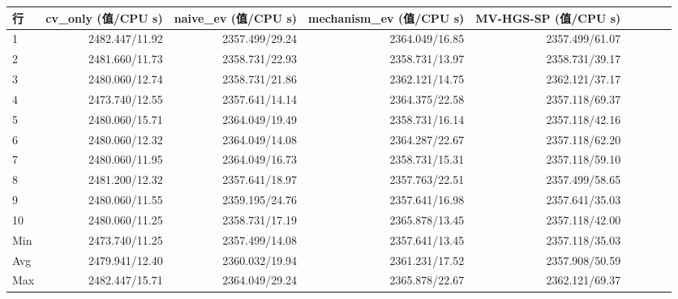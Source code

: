 \begin{tabular}{lrrrrrrrr}
\toprule
行 & cv_only (值/CPU s) & naive_ev (值/CPU s) & mechanism_ev (值/CPU s) & MV-HGS-SP (值/CPU s) \\
\midrule
1 & 2482.447/11.92 & 2357.499/29.24 & 2364.049/16.85 & 2357.499/61.07 \\
2 & 2481.660/11.73 & 2358.731/22.93 & 2358.731/13.97 & 2358.731/39.17 \\
3 & 2480.060/12.74 & 2358.731/21.86 & 2362.121/14.75 & 2362.121/37.17 \\
4 & 2473.740/12.55 & 2357.641/14.14 & 2364.375/22.58 & 2357.118/69.37 \\
5 & 2480.060/15.71 & 2364.049/19.49 & 2358.731/16.14 & 2357.118/42.16 \\
6 & 2480.060/12.32 & 2364.049/14.08 & 2364.287/22.67 & 2357.118/62.20 \\
7 & 2480.060/11.95 & 2364.049/16.73 & 2358.731/15.31 & 2357.118/59.10 \\
8 & 2481.200/12.32 & 2357.641/18.97 & 2357.763/22.51 & 2357.499/58.65 \\
9 & 2480.060/11.55 & 2359.195/24.76 & 2357.641/16.98 & 2357.641/35.03 \\
10 & 2480.060/11.25 & 2358.731/17.19 & 2365.878/13.45 & 2357.118/42.00 \\
Min & 2473.740/11.25 & 2357.499/14.08 & 2357.641/13.45 & 2357.118/35.03 \\
Avg & 2479.941/12.40 & 2360.032/19.94 & 2361.231/17.52 & 2357.908/50.59 \\
Max & 2482.447/15.71 & 2364.049/29.24 & 2365.878/22.67 & 2362.121/69.37 \\
\bottomrule
\end{tabular}
